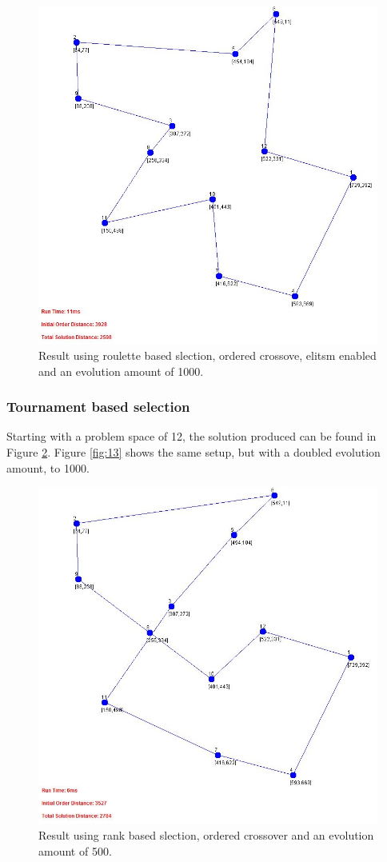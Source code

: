 \documentclass[article]{IEEEtran}
\begin{document}
\begin{figure}[H]
\centering
  \includegraphics[width=.9\linewidth]{images/ordered_routlette_015_1000_true}
  \caption{Result using roulette based slection, ordered crossove, elitsm enabled and an evolution amount of 1000.}
  \label{fig:11}
\end{figure}

\subsubsection{Tournament based selection}
Starting with a problem space of 12, the solution produced can be found in Figure \ref{fig:12}. Figure \ref{fig:13} shows the same setup, but with a doubled evolution amount, to 1000.
\begin{figure}[H]
\centering
  \includegraphics[width=.9\linewidth]{images/ordered_tournament_015_500_false}
  \caption{Result using rank based slection, ordered crossover and an evolution amount of 500.}
  \label{fig:12}
\end{figure}
\end{document}
